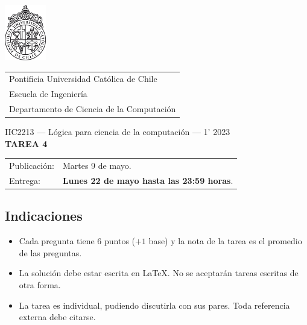 \documentclass{article}
\begin{document}
\includegraphics[width=1.8cm]{uc.png}
\vspace*{-1.9cm}

\hspace*{2.1cm}
 \begin{tabular}{l}
  \sc Pontificia Universidad Católica de Chile \\
  \sc Escuela de Ingeniería \\
  \sc Departamento de Ciencia de la Computación
 \end{tabular}
 \bigskip

\vspace*{5mm}
\begin{center}
{IIC2213 --- Lógica para ciencia de la computación --- 1' 2023} \\
\vspace{3mm}
{\Large\bf TAREA 4} \\
\vspace{2mm}
\end{center}

\begin{tabular}{ll}
Publicación: & Martes 9 de mayo. \\
Entrega: & \textbf{Lunes 22 de mayo hasta las 23:59 horas}. \\
\end{tabular}

\subsection*{Indicaciones}

\begin{itemize}
\item Cada pregunta tiene 6 puntos ($+1$ base) y la nota de la tarea es el promedio de  las preguntas.
\item La solución debe estar escrita en \LaTeX. No se aceptarán tareas escritas de otra forma.
\item La tarea es individual, pudiendo discutirla con sus pares. Toda referencia externa debe citarse.
\end{itemize}
\end{document}
